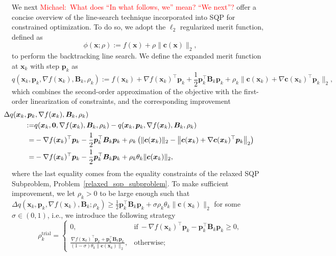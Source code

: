 \documentclass[aos]{imsart}
\numberwithin{equation}{section}
\theoremstyle{plain}
\newcommand{\michael}[1]{\textcolor{red}{Michael:\ #1}}
\begin{document}
We next 
\michael{What does ``In what follows, we'' mean?  ``We next''?}
offer a concise overview of the line-search technique incorporated into SQP for constrained optimization.
To do so, we adopt the $\ell_2$ regularized merit function, defined as
\begin{equation}
    \phi(\bm{x};\rho):= f(\bm{x}) + \rho \|\bm{c}(\bm{x})\|_2,
\end{equation}
to perform the backtracking line search. We define the expanded merit function at $\bm{x}_k$ with step $\bm{p}_k$ as 
\begin{equation}
    q(\bm{x}_k,\bm{p}_k,\nabla f(\bm{x}_k),\bm{B}_k,\rho_k) := f(\bm{x}_{k}) + \nabla f(\bm{x}_k)^{\top} \bm{p}_k + \frac{1}{2} \bm{p}_k^{\top} \bm{B}_k \bm{p}_k + \rho_k \|\bm{c}(\bm{x}_k) + \nabla \bm{c}(\bm{x}_k)^{\top}\bm{p}_k\|_2,
\end{equation}
which combines the second-order approximation of the objective with the first-order linearization of constraints, and the corresponding improvement 
\begin{equation}
\begin{split}
    & 
    \hspace{-15mm}
    \Delta q(\bm{x}_k,\bm{p}_k,\nabla f(\bm{x}_k), \bm{B}_k,\rho_k)\\
    := & q(\bm{x}_k,\bm{0},\nabla f(\bm{x}_k),\bm{B}_k,\rho_k) - q(\bm{x}_k,\bm{p}_k,\nabla f(\bm{x}_k),\bm{B}_k,\rho_k)\\
    = & -\nabla f(\bm{x}_k)^{\top} \bm{p}_k - \frac{1}{2} \bm{p}_k^{\top} \bm{B}_k \bm{p}_k + \rho_k \left(\|\bm{c}(\bm{x}_k)\|_2 - \left\|\bm{c}(\bm{x}_k) + \nabla \bm{c}(\bm{x}_k)^{\top}\bm{p}_k\right\|_2 \right)\\
    = & -\nabla f(\bm{x}_k)^{\top} \bm{p}_k - \frac{1}{2} \bm{p}_k^{\top} \bm{B}_k \bm{p}_k + \rho_k \theta_k \|\bm{c}(\bm{x}_k)\|_2,
\end{split}
\end{equation}
where the last equality comes from the equality constraints of the relaxed SQP Subproblem, Problem~\eqref{relaxed_sqp_subproblem}. 
To make sufficient improvement, we let $\rho_k>0$ to be large enough such that
$\Delta q(\bm{x}_k,\bm{p}_k,\nabla f(\bm{x}_k),\bm{B}_k;\rho_k) \geq \frac{1}{2} \bm{p}_k^{\top} \bm{B}_k \bm{p}_k + \sigma \rho_k \theta_k \|\bm{c}(\bm{x}_k)\|_2$ for some $\sigma \in (0,1)$, i.e., we introduce the following strategy
\begin{equation*}
        \rho_k^{\text{trial}} = \left \{ \begin{array}{cc}
           0,  & \text{if}~ -\nabla f(\bm{x}_k)^{\top} \bm{p}_k - \bm{p}_k^{\top} \bm{B}_k \bm{p}_k \geq 0, \\
           \frac{\nabla f(\bm{x}_k)^{\top} \bm{p}_k + \bm{p}_k^{\top} \bm{B}_k \bm{p}_k}{(1-\sigma)\theta_k \|\bm{c}(\bm{x}_k)\|_2},  &  \text{otherwise;}
        \end{array}\right.
\end{equation*}
\end{document}
